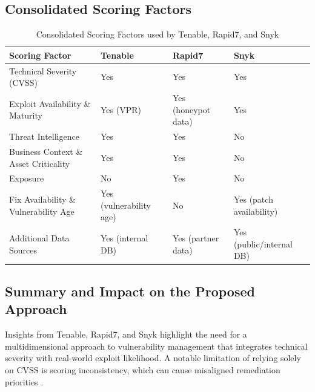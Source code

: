 \subsection*{Consolidated Scoring Factors}
\label{subsec:consolidated_scoring_factors}

\begin{table}[H]
	\centering
	\label{tab:consolidated_scoring_factors}
	\begin{tabular}{|p{3.5cm}|p{3.2cm}|p{3.2cm}|p{3.2cm}|}
		\hline
		\textbf{Scoring Factor}               & \textbf{Tenable}               & \textbf{Rapid7}               & \textbf{Snyk}                   \\ \hline
		Technical Severity (CVSS)             & Yes & Yes & Yes                             \\ \hline
		Exploit Availability \& Maturity      & Yes (VPR)                      & Yes (honeypot data)    & Yes                             \\ \hline
		Threat Intelligence                   & Yes                            & Yes              & No                              \\ \hline
		Business Context \& Asset Criticality & Yes                            & Yes                           & No                              \\ \hline
		Exposure                              & No                             & Yes                           & No                              \\ \hline
		Fix Availability \& Vulnerability Age & Yes (vulnerability age) & No                            & Yes (patch availability) \\ \hline
		Additional Data Sources               & Yes (internal DB)       & Yes (partner data)     & Yes (public/internal DB) \\ \hline
	\end{tabular}
    	\caption{Consolidated Scoring Factors used by Tenable, Rapid7, and Snyk}
\end{table}

\subsection*{Summary and Impact on the Proposed Approach}
\label{subsec:summary_impact}

Insights from Tenable, Rapid7, and Snyk highlight the need for a multidimensional approach to vulnerability management that integrates technical severity with real-world exploit likelihood. A notable limitation of relying solely on \ac{CVSS} is scoring inconsistency, which can cause misaligned remediation priorities \autocite{spring_time_2021}.

